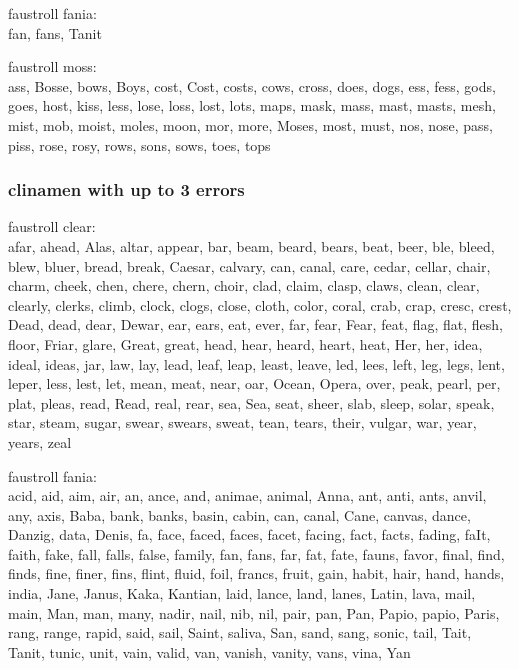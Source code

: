faustroll fania:\\
fan, fans, Tanit

faustroll moss:\\
ass, Bosse, bows, Boys, cost, Cost, costs, cows, cross, does, dogs, ess, fess, gods, goes, host, kiss, less, lose, loss, lost, lots, maps, mask, mass, mast, masts, mesh, mist, mob, moist, moles, moon, mor, more, Moses, most, must, nos, nose, pass, piss, rose, rosy, rows, sons, sows, toes, tops

\subsubsection{clinamen with up to 3 errors}

faustroll clear:\\
afar, ahead, Alas, altar, appear, bar, beam, beard, bears, beat, beer, ble, bleed, blew, bluer, bread, break, Caesar, calvary, can, canal, care, cedar, cellar, chair, charm, cheek, chen, chere, chern, choir, clad, claim, clasp, claws, clean, clear, clearly, clerks, climb, clock, clogs, close, cloth, color, coral, crab, crap, cresc, crest, Dead, dead, dear, Dewar, ear, ears, eat, ever, far, fear, Fear, feat, flag, flat, flesh, floor, Friar, glare, Great, great, head, hear, heard, heart, heat, Her, her, idea, ideal, ideas, jar, law, lay, lead, leaf, leap, least, leave, led, lees, left, leg, legs, lent, leper, less, lest, let, mean, meat, near, oar, Ocean, Opera, over, peak, pearl, per, plat, pleas, read, Read, real, rear, sea, Sea, seat, sheer, slab, sleep, solar, speak, star, steam, sugar, swear, swears, sweat, tean, tears, their, vulgar, war, year, years, zeal

faustroll fania:\\
acid, aid, aim, air, an, ance, and, animae, animal, Anna, ant, anti, ants, anvil, any, axis, Baba, bank, banks, basin, cabin, can, canal, Cane, canvas, dance, Danzig, data, Denis, fa, face, faced, faces, facet, facing, fact, facts, fading, faIt, faith, fake, fall, falls, false, family, fan, fans, far, fat, fate, fauns, favor, final, find, finds, fine, finer, fins, flint, fluid, foil, francs, fruit, gain, habit, hair, hand, hands, india, Jane, Janus, Kaka, Kantian, laid, lance, land, lanes, Latin, lava, mail, main, Man, man, many, nadir, nail, nib, nil, pair, pan, Pan, Papio, papio, Paris, rang, range, rapid, said, sail, Saint, saliva, San, sand, sang, sonic, tail, Tait, Tanit, tunic, unit, vain, valid, van, vanish, vanity, vans, vina, Yan

